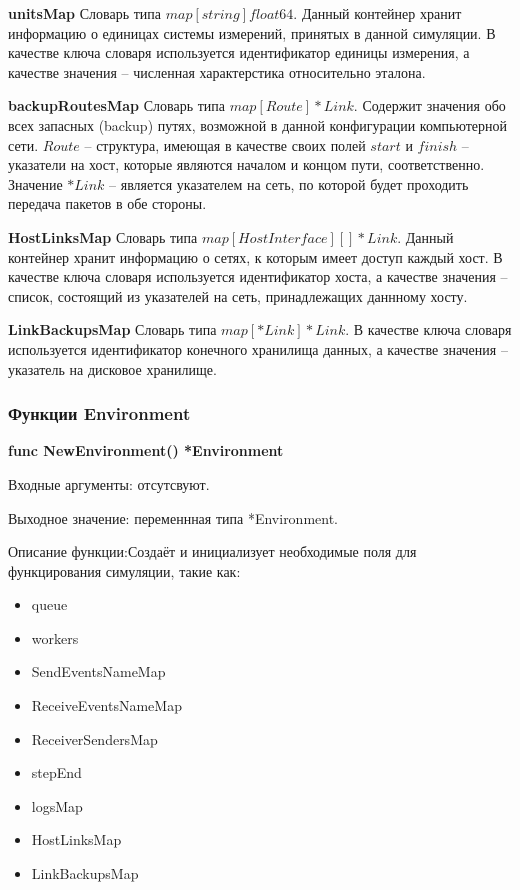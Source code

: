 \textbf{unitsMap} 
Словарь типа $map[string]float64$. Данный контейнер хранит информацию о единицах системы измерений, принятых в данной симуляции. В качестве ключа словаря используется идентификатор единицы измерения, а качестве значения -- численная характерстика относительно эталона.

\textbf{backupRoutesMap} 
Словарь типа  $map[Route]*Link$. Содержит значения обо всех запасных (backup) путях, возможной в данной конфигурации компьютерной сети. $Route$ -- структура, имеющая в качестве своих полей $start$ и $finish$ -- указатели на хост, которые являются началом и концом пути, соответственно. Значение $*Link$ -- является указателем на сеть, по которой будет проходить передача пакетов в обе стороны.

\textbf{HostLinksMap}
Словарь типа $map[HostInterface][]*Link$. Данный контейнер хранит информацию о сетях, к которым имеет доступ каждый хост. В качестве ключа словаря используется идентификатор хоста, а качестве значения -- список, состоящий из указателей на сеть, принадлежащих даннному хосту.

\textbf{LinkBackupsMap}  
Словарь типа $map[*Link]*Link$.  В качестве ключа словаря используется идентификатор конечного хранилища данных, а качестве значения -- указатель на дисковое хранилище.

\subsubsection{Функции Environment}
\textbf{func NewEnvironment() *Environment}

Входные аргументы: отсутсвуют.

Выходное значение: переменнная типа *Environment.

Описание функции:Создаёт и инициализует необходимые поля для функцирования симуляции, такие как:
\begin{itemize}
\item 		queue           
\item 		workers        
\item 		SendEventsNameMap 
\item 		ReceiveEventsNameMap
\item 		ReceiverSendersMap
\item 		stepEnd
\item 		logsMap
\item 		HostLinksMap
\item 		LinkBackupsMap
\end{itemize}

